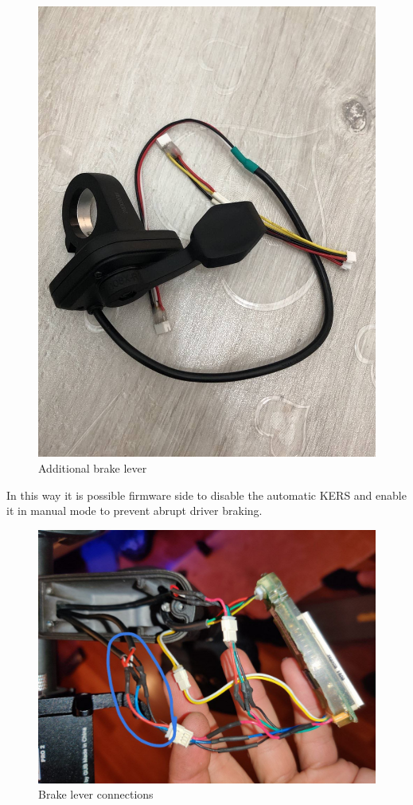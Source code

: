 \documentclass[binding=0.6cm,LaM,noexaminfo]{sapthesis}
\begin{document}
\begin{itemize}
    \begin{figure}[!htp]
    \centering
    \includegraphics[width = .5\textwidth]{images/leva_freno.jpeg}
    \caption{Additional brake lever}
    \label{fig:my_label}
    \end{figure}
    
    \noindent In this way it is possible firmware side to disable the automatic KERS and enable it in manual mode to prevent abrupt driver braking.
    
    \newpage
    \begin{figure}[!htp]
    \centering
    \includegraphics[width = .7\textwidth]{images/collegamenti_leva.jpeg}
    \caption{Brake lever connections}
    \label{fig:my_label}
    \end{figure}
    

\end{itemize}
\end{document}
